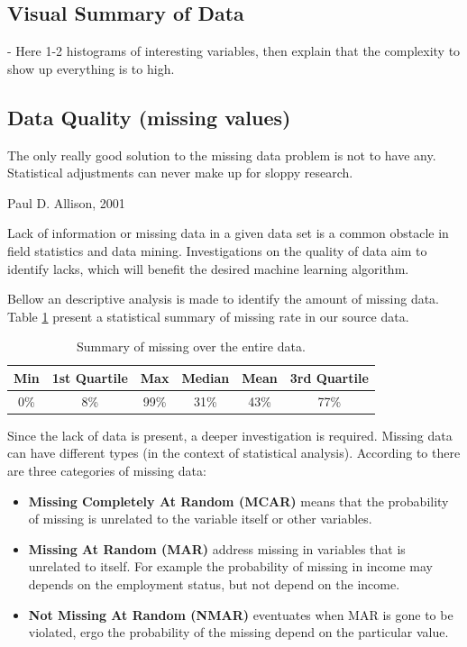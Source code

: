 \subsection{Visual Summary of Data}\label{Ch:2:VSummary} 
 
- Here  1-2 histograms of interesting variables, then explain that the complexity to show up everything is to high.

\subsection{Data Quality (missing values)}\label{Ch:2:DataQuality}
\epigraph{The only really good solution to the missing data problem is not to have any. Statistical adjustments can never make up for sloppy research. }{Paul D. Allison, 2001}
\label{intro}

Lack of information or missing data in a given data set is a common obstacle in field statistics and data mining. Investigations on the quality of data aim to identify lacks, which will benefit the desired machine learning algorithm. 

Bellow an descriptive analysis is made to identify the amount of missing data. Table \ref{tab:missings-over-all} present a statistical summary of missing rate in our source data.
 \begin{table}[h!]
  \begin{center}
    \caption{Summary of missing over the entire data.}
    \label{tab:missings-over-all}
    \begin{tabular}{c|c|c|c|c|c}
    Min & 1st Quartile & Max & Median & Mean & 3rd Quartile \\
      \hline
     0\% & 8\% & 99\% & 31\% & 43\% & 77\% \\ 
     \hline 
    \end{tabular}
  \end{center}
\end{table}

Since the lack of data is present, a deeper investigation is required. Missing data can have different types (in the context of statistical analysis). According to \cite{Allison:2007} there are three categories of missing data:

 \begin{itemize}
    \item \textbf{Missing Completely At Random (MCAR)} means that the probability of missing is unrelated to the variable itself or other variables. 
    \item \textbf{Missing At Random (MAR)} address missing in variables that is unrelated to itself. For example the probability of missing in income may depends on the employment status, but not depend on the income.
    \item \textbf{Not Missing At Random (NMAR)} eventuates when MAR is gone to be violated, ergo the probability of the missing depend on the particular value.
 \end{itemize}
 
